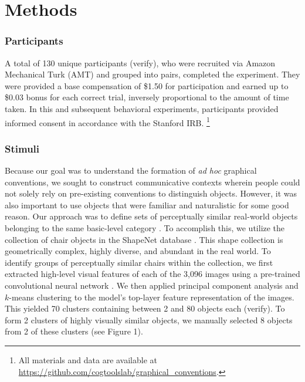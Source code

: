 \documentclass[10pt,letterpaper]{article}
\begin{document}





\section{Methods}

\subsubsection{Participants}
A total of 130 unique participants (verify), who were recruited via Amazon Mechanical Turk (AMT) and grouped into pairs, completed the experiment. They were provided a base compensation of \$1.50 for participation and earned up to \$0.03 bonus for each correct trial, inversely proportional to the amount of time taken. In this and subsequent behavioral experiments, participants provided informed consent in accordance with the Stanford IRB.
\footnote{All materials and data are available at \url{https://github.com/cogtoolslab/graphical_conventions}.}

\subsubsection{Stimuli}
Because our goal was to understand the formation of \textit{ad hoc} graphical conventions, we sought to construct communicative contexts wherein people could not solely rely on pre-existing conventions to distinguish objects. 
However, it was also important to use objects that were familiar and naturalistic for some good reason.
Our approach was to define sets of perceptually similar real-world objects belonging to the same basic-level category \cite{MervisRosch81_CategorizationReview}.
To accomplish this, we utilize the collection of chair objects in the ShapeNet database \cite{chang2015shapenet}. 
This shape collection is  geometrically complex, highly diverse, and abundant in the real world. 
To identify groups of perceptually similar chairs within the collection, we first extracted high-level visual features of each of the 3,096 images using a pre-trained convolutional neural network \cite{simonyan2014very}. 
We then applied principal component analysis and $k$-means clustering to the model's top-layer feature representation of the images. 
This yielded 70 clusters containing between 2 and 80 objects each (verify). To form 2 clusters of highly visually similar objects, we manually selected 8 objects from 2 of these clusters (see Figure 1). 
\end{document}
